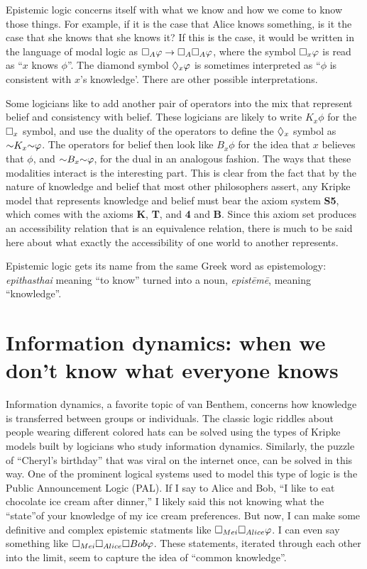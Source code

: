 Epistemic logic concerns itself with what we know and how we come to know those things. For example, if it is the case that Alice knows
something, is it the case that she knows that she knows it? If this is the case, it would be written in the language of modal logic as
$\square_A \varphi \rightarrow \square_A \square_A \varphi$, where the symbol $\square_x \varphi$ is read as ``$x$ knows $\phi$''. The diamond
symbol $\lozenge_x \varphi$ is sometimes interpreted as ``$\phi$ is consistent with $x$'s knowledge'. There are other possible interpretations.

Some logicians like to add another pair of operators into the mix that represent belief and consistency with belief. These logicians are likely
to write $K_x \phi$ for the $\square_x$ symbol, and use the duality of the operators to define the $\lozenge_x$ symbol as $\mathord{\sim} K_x
\mathord{\sim} \varphi$. The operators for belief then look like $B_x \phi$ for the idea that $x$ believes that $\phi$, and $\mathord{\sim} B_x \mathord{\sim} \varphi$,
for the dual in an analogous fashion. The ways that these modalities interact is the interesting part. This is clear from the fact that
by the nature of knowledge and belief that most other philosophers assert, any Kripke model that represents knowledge and belief must bear the
axiom system \textbf{S5}, which comes with the axioms \textbf{K}, \textbf{T}, and \textbf{4} and \textbf{B}. Since this axiom set produces an
accessibility relation that is an equivalence relation, there is much to be said here about what exactly the accessibility of one world to another
represents. 

Epistemic logic gets its name from the same Greek word as epistemology: \emph{epithasthai} meaning ``to know'' turned into a noun, \emph{epist\=em\=e},
meaning ``knowledge''.

\section{Information dynamics: when we don't know what everyone knows}

Information dynamics, a favorite topic of van Benthem, concerns how knowledge is transferred between groups or individuals. The classic logic
riddles about people wearing different colored hats can be solved using the types of Kripke models built by logicians who study information
dynamics. Similarly, the puzzle of ``Cheryl's birthday'' that was viral on the internet once, can be solved in this way. One of the prominent
logical systems used to model this type of logic is the Public Announcement Logic (PAL). If I say to Alice and Bob, ``I like to eat chocolate
ice cream after dinner,'' I likely said this not knowing what the ``state''of your knowledge of my ice cream preferences. But now, I can make some
definitive and complex epistemic statments like $\square_{Mei} \square_{Alice} \varphi$. I can even say something like $\square_{Mei} \square_{Alice}
\square{Bob} \varphi$. These statements, iterated through each other into the limit, seem to capture the idea of ``common knowledge''. 

